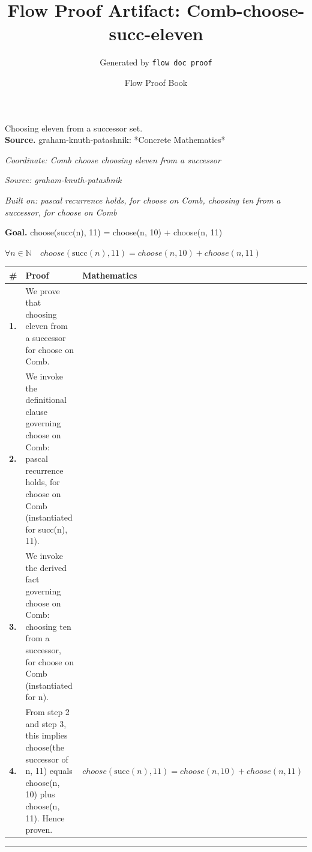 \documentclass[11pt]{article}
\title{Flow Proof Artifact: Comb-choose-succ-eleven}
\author{Generated by \texttt{flow doc proof}}
\date{Flow Proof Book}
\theoremstyle{definition}
\begin{document}
\maketitle
Choosing eleven from a successor set.\\[0.5em]
\textbf{Source.} graham-knuth-patashnik: *Concrete Mathematics*\\[0.5em]
\bigskip
{}\par
\smallskip\noindent\textit{Coordinate: Comb \cdot choose \cdot choosing eleven from a successor}\par
\smallskip\noindent\textit{Source: graham-knuth-patashnik}\par
\smallskip\noindent\textit{Built on: pascal recurrence holds, for choose on Comb, choosing ten from a successor, for choose on Comb}\par
\medskip
\noindent\textbf{Goal.} choose(succ(n), 11) = choose(n, 10) + choose(n, 11)\par
\noindent$\displaystyle \forall n \in \mathbb{N}\quad choose(\mathrm{succ}(n), 11) = choose(n, 10) + choose(n, 11)$\par
\medskip
\noindent
\begin{tabular}{@{} >{\raggedright\arraybackslash}p{} >{\raggedright\arraybackslash}p{} >{\raggedleft\arraybackslash}p{} @{}}
\textbf{\#} & \textbf{Proof} & \textbf{Mathematics} \\
\midrule
\textbf{1.} & We prove that choosing eleven from a successor for choose on Comb. & \\[0.45em]
\textbf{2.} & We invoke the definitional clause governing choose on Comb: pascal recurrence holds, for choose on Comb (instantiated for succ(n), 11). & \\[0.45em]
\textbf{3.} & We invoke the derived fact governing choose on Comb: choosing ten from a successor, for choose on Comb (instantiated for n). & \\[0.45em]
\textbf{4.} & From step 2 and step 3, this implies choose(the successor of n, 11) equals choose(n, 10) plus choose(n, 11). Hence proven. & $\displaystyle choose(\mathrm{succ}(n), 11) = choose(n, 10) + choose(n, 11)$ \\[0.45em]
\bottomrule
\end{tabular}
\label{thm:Comb-choose-choosing_eleven_from_a_successor}
\par\medskip\hrule
\end{document}
